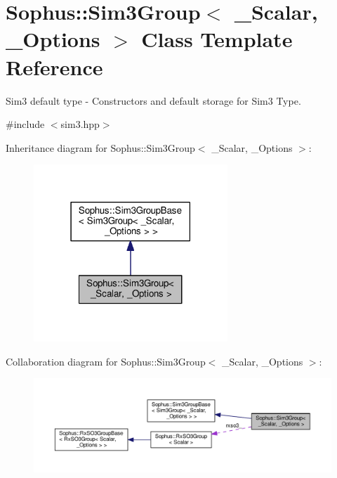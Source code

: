 \hypertarget{class_sophus_1_1_sim3_group}{}\section{Sophus\+:\+:Sim3\+Group$<$ \+\_\+\+Scalar, \+\_\+\+Options $>$ Class Template Reference}
\label{class_sophus_1_1_sim3_group}


Sim3 default type -\/ Constructors and default storage for Sim3 Type.  




{\ttfamily \#include $<$sim3.\+hpp$>$}



Inheritance diagram for Sophus\+:\+:Sim3\+Group$<$ \+\_\+\+Scalar, \+\_\+\+Options $>$\+:
\nopagebreak
\begin{figure}[H]
\begin{center}
\leavevmode
\includegraphics[width=207pt]{class_sophus_1_1_sim3_group__inherit__graph}
\end{center}
\end{figure}


Collaboration diagram for Sophus\+:\+:Sim3\+Group$<$ \+\_\+\+Scalar, \+\_\+\+Options $>$\+:
\nopagebreak
\begin{figure}[H]
\begin{center}
\leavevmode
\includegraphics[width=350pt]{class_sophus_1_1_sim3_group__coll__graph}
\end{center}
\end{figure}
